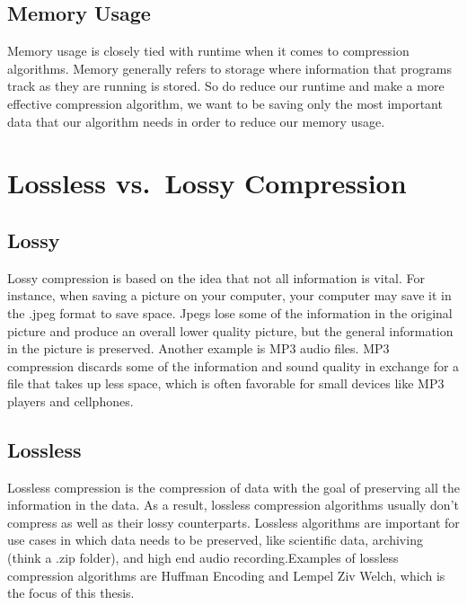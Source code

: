 \documentclass[12pt,twoside]{reedthesis}
\begin{document}
\hypertarget{memory-usage}{%
\subsection{Memory Usage}\label{memory-usage}}

Memory usage is closely tied with runtime when it comes to compression algorithms. Memory generally refers to storage where information that programs track as they are running is stored. So do reduce our runtime and make a more effective compression algorithm, we want to be saving only the most important data that our algorithm needs in order to reduce our memory usage.

\hypertarget{lossless-vs.-lossy-compression}{%
\section{Lossless vs.~Lossy Compression}\label{lossless-vs.-lossy-compression}}

\hypertarget{lossy}{%
\subsection{Lossy}\label{lossy}}

Lossy compression is based on the idea that not all information is vital. For instance, when saving a picture on your computer, your computer may save it in the .jpeg format to save space. Jpegs lose some of the information in the original picture and produce an overall lower quality picture, but the general information in the picture is preserved. Another example is MP3 audio files. MP3 compression discards some of the information and sound quality in exchange for a file that takes up less space, which is often favorable for small devices like MP3 players and cellphones.

\hypertarget{lossless}{%
\subsection{Lossless}\label{lossless}}

Lossless compression is the compression of data with the goal of preserving all the information in the data. As a result, lossless compression algorithms usually don't compress as well as their lossy counterparts. Lossless algorithms are important for use cases in which data needs to be preserved, like scientific data, archiving (think a .zip folder), and high end audio recording.Examples of lossless compression algorithms are Huffman Encoding and Lempel Ziv Welch, which is the focus of this thesis.
\end{document}
